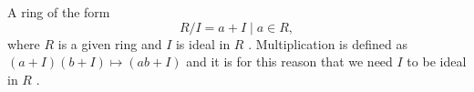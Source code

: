 A ring of the form
 \[ R/I= {a+I \mid a \in R }, \] where  $ R $  is a given ring and  $ I $  is
ideal in  $ R $ .  Multiplication is defined as
 $ (a+I)(b+I) \mapsto (ab+I) $  and it is for this reason that we need  $ I $ 
to be ideal in  $ R $ .

